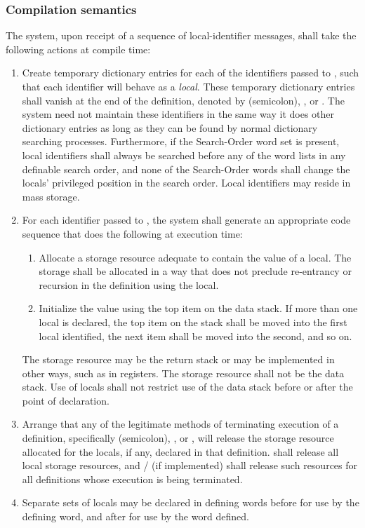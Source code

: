 \subsubsection{Compilation semantics} %

The system, upon receipt of a sequence of local-identifier messages,
shall take the following actions at compile time:
\begin{enumerate}
\item Create temporary dictionary entries for each of the
	identifiers passed to , such that each identifier
	will behave as a \emph{local}. These temporary dictionary
	entries shall vanish at the end of the definition, denoted by
	\word[core]{;} (semicolon), , or
	. The system need not maintain these
	identifiers in the same way it does other dictionary entries
	as long as they can be found by normal dictionary searching
	processes. Furthermore, if the Search-Order word set is present,
	local identifiers shall always be searched before any of the
	word lists in any definable search order, and none of the
	Search-Order words shall change the locals' privileged position
	in the search order. Local identifiers may reside in mass storage.

\item For each identifier passed to , the system shall
	generate an appropriate code sequence that does the following at
	execution time:
	\begin{enumerate}
	\item Allocate a storage resource adequate to contain the value
		of a local. The storage shall be allocated in a way that
		does not preclude re-entrancy or recursion in the definition
		using the local.
	\item Initialize the value using the top item on the data stack.
		If more than one local is declared, the top item on the
		stack shall be moved into the first local identified, the
		next item shall be moved into the second, and so on.
	\end{enumerate}

	The storage resource may be the return stack or may be
	implemented in other ways, such as in registers. The storage
	resource shall not be the data stack. Use of locals shall not
	restrict use of the data stack before or after the point of
	declaration.

\item Arrange that any of the legitimate methods of terminating
	execution of a definition, specifically \word[core]{;}
	(semicolon), ,  or
	, will release the storage resource allocated
	for the locals, if any, declared in that definition.
	 shall release all local storage resources,
	and  /  (if
	implemented) shall release such resources for all definitions
	whose execution is being terminated.

\item Separate sets of locals may be declared in defining words
	before  for use by the defining word, and
	after  for use by the word defined.
\end{enumerate}

